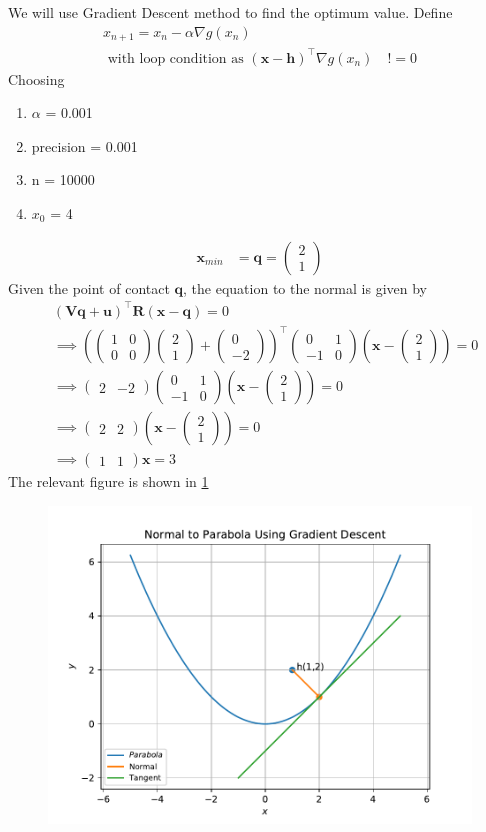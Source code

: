 \documentclass[12pt]{article}
\providecommand{\brak}[1]{\ensuremath{\left(#1\right)}}
\newcommand{\myvec}[1]{\ensuremath{\begin{pmatrix}#1\end{pmatrix}}}
\let\vec\mathbf
\begin{document}
\begin{enumerate}
We will use Gradient Descent method to find the optimum value. Define
\begin{align}
	\label{eq:grad_des}
	x_{n+1} = x_n - \alpha \nabla g\brak{x_n} \\
	\text{ with loop condition as } \brak{\vec{x}-\vec{h}}^\top\nabla g\brak{x_n} \quad != 0 
\end{align}
Choosing
\begin{enumerate}
\item $\alpha$ = 0.001
\item precision = 0.001
\item n = 10000
\item $x_0$ = 4 
\end{enumerate}
\begin{align}
	\vec{x}_{min} &= \vec{q} = \myvec{ 2 \\1} 
\end{align}
Given the point of contact $\vec{q}$, the equation to the normal is given by
\begin{align}
	&\brak{\vec{V}\vec{q}+\vec{u}}^\top\vec{R}\brak{\vec{x}-\vec{q}} = 0 \\
	&\implies \brak{\myvec{1&0\\0&0}\myvec{2\\1}+\myvec{0 \\ -2}}^\top \myvec{0&1 \\-1&0}\brak{\vec{x}-\myvec{2\\1}} =0\\
	&\implies \myvec{2&-2} \myvec{0&1 \\-1&0}\brak{\vec{x}-\myvec{2\\1}} = 0 \\
	&\implies \myvec{2&2}\brak{\vec{x}-\myvec{2\\1}} = 0 \\
	&\implies \myvec{1&1}\vec{x} = 3 
\end{align}
The relevant figure is shown in \ref{fig:Fig1}
\begin{figure}[!h]
	\begin{center}
		\includegraphics[width=\columnwidth]{figs/problem23.pdf}
	\end{center}
\caption{}
\label{fig:Fig1}
\end{figure}
\end{enumerate}
\end{document}

